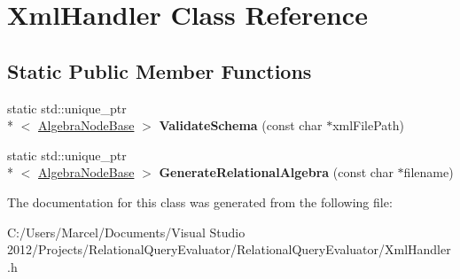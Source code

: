 \hypertarget{class_xml_handler}{\section{Xml\+Handler Class Reference}
\label{class_xml_handler}
}
\subsection*{Static Public Member Functions}
\begin{DoxyCompactItemize}
\item 
\hypertarget{class_xml_handler_a3808138f56ca91a2ed0ff7636a5a4044}{static std\+::unique\+\_\+ptr\\*
$<$ \hyperlink{class_algebra_node_base}{Algebra\+Node\+Base} $>$ {\bfseries Validate\+Schema} (const char $\ast$xml\+File\+Path)}\label{class_xml_handler_a3808138f56ca91a2ed0ff7636a5a4044}

\item 
\hypertarget{class_xml_handler_aa972fef87222fed1d2ed17b6f1aa9cd2}{static std\+::unique\+\_\+ptr\\*
$<$ \hyperlink{class_algebra_node_base}{Algebra\+Node\+Base} $>$ {\bfseries Generate\+Relational\+Algebra} (const char $\ast$filename)}\label{class_xml_handler_aa972fef87222fed1d2ed17b6f1aa9cd2}

\end{DoxyCompactItemize}


The documentation for this class was generated from the following file\+:\begin{DoxyCompactItemize}
\item 
C\+:/\+Users/\+Marcel/\+Documents/\+Visual Studio 2012/\+Projects/\+Relational\+Query\+Evaluator/\+Relational\+Query\+Evaluator/Xml\+Handler.\+h\end{DoxyCompactItemize}
